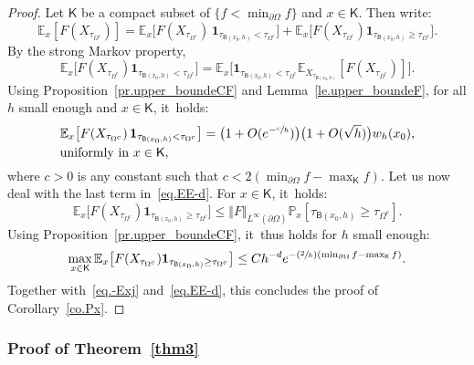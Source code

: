 \documentclass[JEP,XML,SOM,Unicode,NoEqCountersInSection,NoFloatCountersInSection,published]{cedram}
\newcommand{\Psfrac}[2]{(\sfrac{#1}{#2})}
\theoremstyle{plain}
\theoremstyle{definition}
\begin{document}
\begin{proof}
Let $\mathsf K$ be a compact subset of $\{f<\min_{\partial \Omega}f\}$ and $x\in \mathsf K$. Then write:
\begin{equation}\label{eq.EE-d}
\mathbb E_{x} [F(X_{\tau_{\Omega^c}})]= \mathbb E_{x} \big [F(X_{\tau_{\Omega^c}})\, \mathbf{1}_{ \tau_{\mathsf B(x_0,h)}<\tau_{\Omega^c} }\big]+\mathbb E_{x} \big [F(X_{\tau_{\Omega^c}}) \mathbf{1}_{ \tau_{\mathsf B(x_0,h)}\ge \tau_{\Omega^c} }\big].
\end{equation}
By the strong Markov property,
\[
\mathbb E_{x} \big [F(X_{\tau_{\Omega^c}})\mathbf{1}_{ \tau_{\mathsf B(x_0,h)}<\tau_{\Omega^c} }\big]= \mathbb E_{x} \big [ \mathbf{1}_{ \tau_{\mathsf B(x_0,h)}<\tau_{\Omega^c} }\mathbb E_{X_{\tau_{\mathsf B(x_0,h)}}}[F(X_{\tau_{\Omega^c}})]\big].
\]
Using Proposition~\ref{pr.upper_boundeCF}
and Lemma~\ref{le.upper_boundeF}, for all $h$ small enough and $x\in \mathsf K$, it~holds:
\begin{equation}\label{eq.-Exj}
\begin{aligned}
& \mathbb E_{x} \big [F(X_{\tau_{\Omega^c}})\, \mathbf{1}_{
\tau_{\mathsf B (x_0,h)}<\tau_{\Omega^c} }\big]= \bigl(1+O(e^{-\sfrac
ch})\bigr)\bigl(1+O(\sqrt h)\bigr)w_h(x_0),\\
& \text{uniformly in $x\in \mathsf K$},
\end{aligned}
\end{equation}
where $c>0$ is any constant such that $c<2(\min_{\partial \Omega }f-\max_{\mathsf K} f)$. Let us now deal with the last term in~\eqref{eq.EE-d}.
For $x\in \mathsf K$, it~holds:
\[
\mathbb E_{x} \big [F(X_{\tau_{\Omega^c}}) \mathbf{1}_{ \tau_{\mathsf B(x_0,h)}\ge \tau_{\Omega^c} }\big]\le \Vert F\Vert _{L^\infty(\partial \Omega)} \mathbb P_{x} [\tau_{\mathsf B(x_0,h)}\ge \tau_{\Omega^c}].
\]
Using Proposition~\ref{pr.upper_boundeCF}, it~thus holds for $h$ small enough:\vspace*{-2pt}
\[
\max_{x\in \mathsf K}\mathbb E_{x} \big [F(X_{\tau_{\Omega^c}}) \mathbf{1}_{ \tau_{\mathsf B(x_0,h)}\ge \tau_{\Omega^c} }\big]\le Ch^{-d}e^{-\Psfrac 2h (\min_{\partial \Omega }f-\max_{\mathsf K} f)}.
\]
Together with~\eqref{eq.-Exj} and~\eqref{eq.EE-d}, this concludes the proof of Corollary~\ref{co.Px}.
\end{proof}

\subsubsection{Proof of Theorem~\ref{thm3}}
\end{document}
